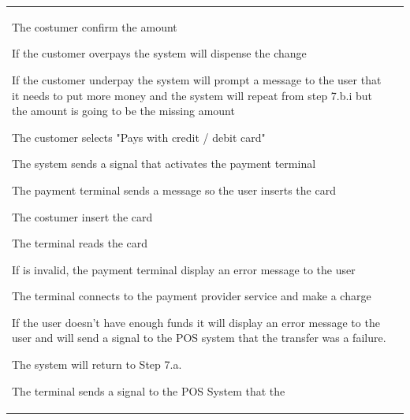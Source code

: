 \documentclass[12pt]{article}
\newenvironment{packed_enum}{
\begin{enumerate}[leftmargin=15pt, itemsep=0pt, parsep=0pt, font=\small]
  \setlength{\itemsep}{0pt}
  \setlength{\parskip}{0pt}
  \setlength{\parsep}{0pt}
}{\end{enumerate}}
\newenvironment{packed_enum_alpha}{
\begin{enumerate}[leftmargin=15pt, label=\alph*., font=\small]
  \setlength{\itemsep}{0pt}
  \setlength{\parskip}{0pt}
  \setlength{\parsep}{0pt}
}{\end{enumerate}}
\newenvironment{packed_item}{
\begin{itemize}
  \setlength{\itemsep}{0.1pt}
  \setlength{\parskip}{0pt}
  \setlength{\parsep}{0pt}
}{\end{itemize}}
\begin{document}
\begin{longtable}{| p{} | p{} |}
\begin{packed_enum}
\begin{footnotesize}
\begin{packed_enum_alpha}
\begin{packed_enum}
                    \item The costumer confirm the amount
                    \begin{packed_enum}
                        \item If the customer overpays the system will dispense 
                        the change
                        \item If the customer underpay the system will prompt a 
                        message to the user that it needs to put more money and 
                        the system will repeat from step 7.b.i but the amount is 
                        going to be the missing amount
                    \end{packed_enum}
                \end{packed_enum}
                \item The customer selects "Pays with credit / debit card"
                \begin{packed_enum}
                    \item The system sends a signal that activates the payment 
                    terminal
                    \item The payment terminal sends a message so the user 
                    inserts the card
                    \item The costumer insert the card
                    \item The terminal reads the card
                    \begin{packed_item}
                        \item If is invalid, the payment terminal display an 
                        error message to the user
                    \end{packed_item}
                    \item The terminal connects to the payment provider service 
                    and make a charge
                    \begin{packed_enum}
                        \item If the user doesn't have enough funds it will 
                        display an error message to the user and will send a 
                        signal to the POS system that the transfer was 
                        a failure.
                        \item The system will return to Step 7.a.
                    \end{packed_enum}
                    \item The terminal sends a signal to the POS System that the 

\end{packed_enum}
\end{packed_enum_alpha}
\end{footnotesize}
\end{packed_enum}
\end{longtable}
\end{document}
